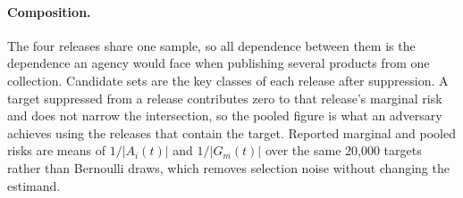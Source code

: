 \documentclass[11pt,a4paper]{article}
\theoremstyle{plain}
\theoremstyle{definition}
\begin{document}
\paragraph{Composition.} The four releases share one sample, so all dependence
between them is the dependence an agency would face when publishing several
products from one collection. Candidate sets are the key classes of each
release after suppression. A target suppressed from a release contributes zero
to that release's marginal risk and does not narrow the intersection, so the
pooled figure is what an adversary achieves using the releases that contain the
target. Reported marginal and pooled risks are means of $1/|A_i(t)|$ and
$1/|G_m(t)|$ over the same 20,000 targets rather than Bernoulli draws, which
removes selection noise without changing the estimand.



\end{document}
